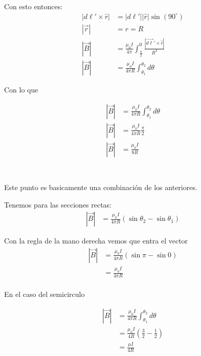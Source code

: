 \documentclass{report}
\begin{document}
Con esto entonces:
\begin{align*}
	\left|d\ell' \times \hat{r} \right| &= \left|d\ell'\right|\left|\hat{r}\right| \sin \left(90^{\circ}\right)\\
	\left| \vec{r}\right| &= r = R\\
	\left|\vec{B}\right| &= \frac{\mu_0 I}{4\pi} \int_{\frac{\pi}{2}}^0 \frac{\left|\vec{d\ell}'\times \hat{r}\right|}{R^2}\\
	\left|\vec{B}\right| &= \frac{\mu_0 I}{4\pi R} \int_{\theta_1}^{\theta_2} d\theta
\end{align*}

Con lo que

\begin{align*}
	\left|\vec{B}\right| &= \frac{\mu_0 I}{4\pi R} \int_{\theta_1}^{\theta_2} d\theta\\
	\left|\vec{B}\right| &= \frac{\mu_0 I}{4\pi R} \frac{\pi}{2}\\
	\left|\vec{B}\right| &= \frac{\mu_0 I}{8 R}\\
\end{align*}

\section{}

Este punto es basicamente una combinación de los anteriores.

Tenemos para las secciones rectas:
\begin{align*}
	\left| \vec{B} \right| &= \frac{\mu_0 I}{4\pi R} \left(\sin\theta_2 - \sin\theta_1\right)
\end{align*}

Con la regla de la mano derecha vemos que entra el vector
\begin{align*}
	\left| \vec{B} \right| &= \frac{\mu_0 I}{4\pi R}\left(\sin\pi - \sin 0\right)\\
	&= \frac{\mu_0 I}{4\pi R}\\
\end{align*}

En el caso del semicirculo 

\begin{align*}
	\left| \vec{B}\right| &= \frac{\mu_0 I}{4\pi R} \int_{\theta_1}^{\theta_2} d\theta\\
	&= \frac{\mu_0 I}{4 R}\left( \frac{3}{2} - \frac{1}{2}\right)\\
	&= \frac{\mu I}{4 R}
\end{align*}
\end{document}
